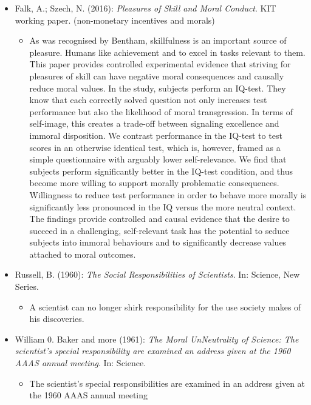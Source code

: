 \begin{itemize}
	\item Falk, A.; Szech, N. (2016): \textit{Pleasures of Skill and Moral Conduct}. KIT working paper. (non-monetary incentives and morals)
		\begin{itemize}
			\item As was recognised by Bentham, skillfulness is an important source of pleasure. Humans like achievement and to excel in tasks relevant to them. This paper provides controlled experimental evidence that striving for pleasures of skill can have negative moral consequences and causally reduce moral values. In the study, subjects perform an IQ-test. They know that each correctly solved question not only increases test performance but also the likelihood of moral transgression. In terms of self-image, this creates a trade-off between signaling excellence and immoral disposition. We contrast performance in the IQ-test to test scores in an otherwise identical test, which is, however, framed as a simple questionnaire with arguably lower self-relevance. We find that subjects perform significantly better in the IQ-test condition, and thus become more willing to support morally problematic consequences. Willingness to reduce test performance in order to behave more morally is significantly less pronounced in the IQ versus the more neutral context. The findings provide controlled and causal evidence that the desire to succeed in a challenging, self-relevant task has the potential to seduce subjects into immoral behaviours and to significantly decrease values attached to moral outcomes.
		\end{itemize}
	\item Russell, B. (1960): \textit{The Social Responsibilities of Scientists}. In: Science, New Series.
		\begin{itemize}
			\item A scientist can no longer shirk responsibility for the use society makes of his discoveries.
		\end{itemize}
	\item William 0. Baker and more (1961): \textit{The Moral UnNeutrality of Science: The scientist's special responsibility are examined an address given at the 1960 AAAS annual meeting}. In: Science.
		\begin{itemize}
			\item The scientist's special responsibilities are examined in an address given at the 1960 AAAS annual meeting
		\end{itemize}
\end{itemize}


\newpage